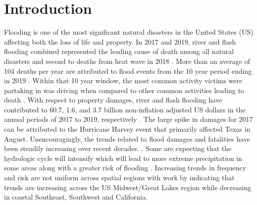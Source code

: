 \section{Introduction}
%
Flooding is one of the most significant natural disasters in the United States (US) affecting both the loss of life and property. 
In 2017 and 2019, river and flash flooding combined represented the leading cause of death among all natural disasters and second to deaths from heat wave in 2018 \cite{national_weather_service_2020,national_weather_service_2019,national_weather_service_2018}. 
More than an average of 104 deaths per year are attributed to flood events from the 10 year period ending in 2019 \cite{us_department_of_commerce_2020}. 
Within that 10 year window, the most common activity victims were partaking in was driving when compared to other common activities leading to death \cite{us_department_of_commerce_2020}.
With respect to property damages, river and flash flooding have contributed to 60.7, 1.6, and 3.7 billion non-inflation adjusted US dollars in the annual periods of 2017 to 2019, respectively \cite{national_weather_service_2020,national_weather_service_2019,national_weather_service_2018}. 
The large spike in damages for 2017 can be attributed to the Hurricane Harvey event that primarily affected Texas in August. 
Unencouragingly, the trends related to flood damages and fatalities have been steadily increasing over recent decades. \cite{mallakpour2015changing,downton2005reanalysis,kunkel1999temporal,pielke2000precipitation,corringham2019effect}. 
Some are expecting that the hydrologic cycle will intensify which will lead to more extreme precipitation in some areas along with a greater risk of flooding \cite{tabari2020climate,milly2002increasing,wing2018estimates}. 
Increasing trends in frequency and risk are not uniform across spatial regions with work by  indicating that trends are increasing across the US Midwest/Great Lakes region while decreasing in coastal Southeast, Southwest and California.
%
